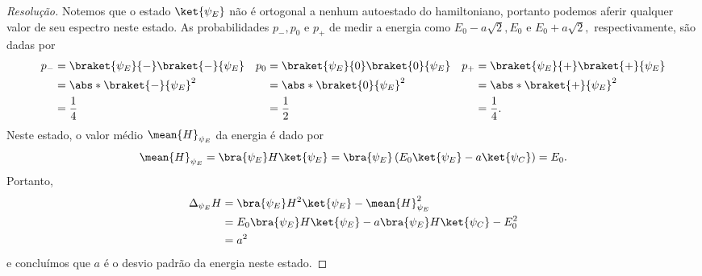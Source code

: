 \begin{proof}[Resolução]
    Notemos que o estado \(\ket{\psi_E}\) não é ortogonal a nenhum autoestado do hamiltoniano, portanto podemos aferir qualquer valor de seu espectro neste estado. As probabilidades \(p_-, p_0\) e \(p_+\) de medir a energia como \(E_0 - a\sqrt{2}, E_0\) e \(E_0 + a\sqrt{2},\) respectivamente, são dadas por
    \begin{align*}
        p_{-} &= \braket{\psi_E}{-}\braket{-}{\psi_E}&
        p_{0} &= \braket{\psi_E}{0}\braket{0}{\psi_E}&
        p_{+} &= \braket{\psi_E}{+}\braket{+}{\psi_E}\\
              &= \abs*{\braket{-}{\psi_E}}^2&
              &= \abs*{\braket{0}{\psi_E}}^2&
              &= \abs*{\braket{+}{\psi_E}}^2\\
              &= \frac14&
              &= \frac12&
              &= \frac14.
    \end{align*}
    Neste estado, o valor médio \(\mean{H}_{\psi_E}\) da energia é dado por
    \begin{equation*}
        \mean{H}_{\psi_E} = \bra{\psi_E}H\ket{\psi_E}
                          = \bra{\psi_E}\left(E_0\ket{\psi_E} - a\ket{\psi_C}\right) = E_0.
    \end{equation*}
    Portanto,
    \begin{align*}
        \Delta_{\psi_E}H &= \bra{\psi_E}H^2\ket{\psi_E} - \mean{H}_{\psi_E}^2\\
                         &= E_0\bra{\psi_E}H\ket{\psi_E} - a \bra{\psi_E} H \ket{\psi_C} - E_0^2\\
                         &= a^2
    \end{align*}
    e concluímos que \(a\) é o desvio padrão da energia neste estado.
\end{proof}

